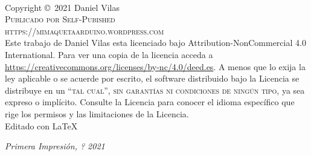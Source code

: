 \documentclass[11pt,fleqn]{book} %
\begin{document}

\begingroup
\thispagestyle{empty} %
\vfill
\endgroup


\newpage
~\vfill
\thispagestyle{empty}

\noindent Copyright \copyright\ 2021 Daniel Vilas\\ %

\noindent \textsc{Publicado por Self-Pubished}\\ %

\noindent \textsc{https://mimaquetaarduino.wordpress.com}\\ %

\noindent Este trabajo de Daniel Vilas esta licenciado bajo Attribution-NonCommercial 4.0 International. Para ver una copia de la licencia acceda a \url{https://creativecommons.org/licenses/by-nc/4.0/deed.es}. A menos que lo exija la ley aplicable o se acuerde por escrito, el software distribuido bajo la Licencia se distribuye en un \textsc{``tal cual'', sin garantías ni condiciones de ningún tipo}, ya sea expreso o implícito. Consulte la Licencia para conocer el idioma específico que rige los permisos y las limitaciones de la Licencia.\\ %

\noindent Editado con \LaTeX{}

\noindent \textit{Primera Impresión, ? 2021} %
\end{document}
